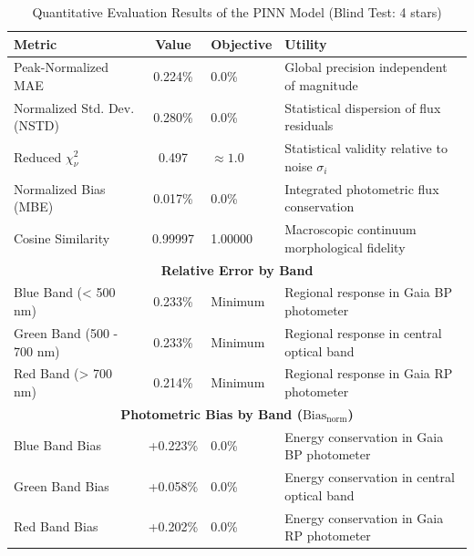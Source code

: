 
\begin{table}[htpb]
\centering
\caption{Quantitative Evaluation Results of the PINN Model (Blind Test: 4 stars)}
\label{tab:pinn_evaluation}
\begin{tabular}{lcll}
\hline
\textbf{Metric} & \textbf{Value} & \textbf{Objective} & \textbf{Utility} \\
\hline
Peak-Normalized MAE & 0.224\% & 0.0\% & Global precision independent of magnitude \\
Normalized Std. Dev. (NSTD) & 0.280\% & 0.0\% & Statistical dispersion of flux residuals \\
Reduced $\chi^2_\nu$ & 0.497 & $\approx 1.0$ & Statistical validity relative to noise $\sigma_i$ \\
Normalized Bias (MBE) & 0.017\% & 0.0\% & Integrated photometric flux conservation \\
Cosine Similarity & 0.99997 & 1.00000 & Macroscopic continuum morphological fidelity \\
\hline
\multicolumn{4}{c}{\textbf{Relative Error by Band}} \\
\hline
Blue Band (< 500 nm) & 0.233\% & Minimum & Regional response in Gaia BP photometer \\
Green Band (500 - 700 nm) & 0.233\% & Minimum & Regional response in central optical band \\
Red Band (> 700 nm) & 0.214\% & Minimum & Regional response in Gaia RP photometer \\
\hline
\multicolumn{4}{c}{\textbf{Photometric Bias by Band ($\text{Bias}_{\text{norm}}$)}} \\
\hline
Blue Band Bias & +0.223\% & 0.0\% & Energy conservation in Gaia BP photometer \\
Green Band Bias & +0.058\% & 0.0\% & Energy conservation in central optical band \\
Red Band Bias & +0.202\% & 0.0\% & Energy conservation in Gaia RP photometer \\
\hline
\end{tabular}
\end{table}
